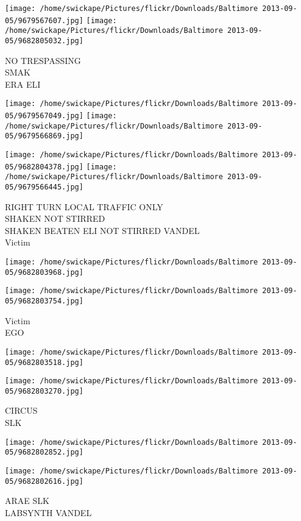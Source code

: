 \documentclass[10pt,letterpaper]{article}
\begin{document}
\vspace{0.25in}
\texttt{[image: /home/swickape/Pictures/flickr/Downloads/Baltimore 2013-09-05/9679567607.jpg]}
\texttt{[image: /home/swickape/Pictures/flickr/Downloads/Baltimore 2013-09-05/9682805032.jpg]}

NO TRESPASSING\\
SMAK\\
ERA ELI
\pagebreak

\texttt{[image: /home/swickape/Pictures/flickr/Downloads/Baltimore 2013-09-05/9679567049.jpg]}
\texttt{[image: /home/swickape/Pictures/flickr/Downloads/Baltimore 2013-09-05/9679566869.jpg]}

\texttt{[image: /home/swickape/Pictures/flickr/Downloads/Baltimore 2013-09-05/9682804378.jpg]}
\texttt{[image: /home/swickape/Pictures/flickr/Downloads/Baltimore 2013-09-05/9679566445.jpg]}

RIGHT TURN LOCAL TRAFFIC ONLY\\
SHAKEN NOT STIRRED\\
SHAKEN BEATEN ELI NOT STIRRED VANDEL\\
Victim
\pagebreak

\texttt{[image: /home/swickape/Pictures/flickr/Downloads/Baltimore 2013-09-05/9682803968.jpg]}

\vspace{0.25in}
\texttt{[image: /home/swickape/Pictures/flickr/Downloads/Baltimore 2013-09-05/9682803754.jpg]}

Victim\\
EGO
\pagebreak

\texttt{[image: /home/swickape/Pictures/flickr/Downloads/Baltimore 2013-09-05/9682803518.jpg]}

\vspace{0.25in}
\texttt{[image: /home/swickape/Pictures/flickr/Downloads/Baltimore 2013-09-05/9682803270.jpg]}

CIRCUS\\
SLK
\pagebreak

\texttt{[image: /home/swickape/Pictures/flickr/Downloads/Baltimore 2013-09-05/9682802852.jpg]}

\vspace{0.25in}
\texttt{[image: /home/swickape/Pictures/flickr/Downloads/Baltimore 2013-09-05/9682802616.jpg]}

ARAE SLK\\
LABSYNTH VANDEL
\pagebreak
\end{document}
